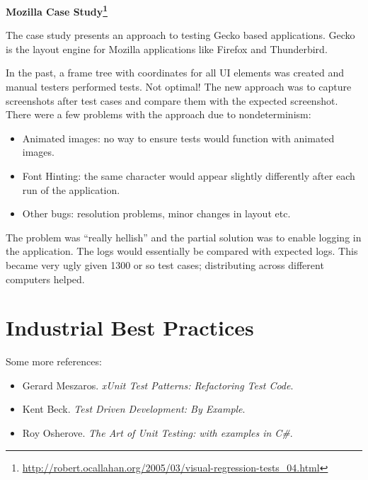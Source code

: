 \documentclass[11pt]{article}
\begin{document}
\textbf{Mozilla Case Study\footnote{\url{http://robert.ocallahan.org/2005/03/visual-regression-tests_04.html}}}

The case study presents an approach to testing Gecko based applications. Gecko is the layout engine for Mozilla applications like Firefox and Thunderbird. 

In the past, a frame tree with coordinates for all UI elements was created and manual testers performed tests. Not optimal! The new approach was to capture screenshots after test cases and compare them with the expected screenshot. There were a few problems with the approach due to nondeterminism: 

\begin{itemize}[noitemsep]
\item Animated images: no way to ensure tests would function with animated images.
\item Font Hinting: the same character would appear slightly differently after each run of the application.
\item Other bugs: resolution problems, minor changes in layout etc.
\end{itemize}

The problem was ``really hellish'' and the partial solution was to enable logging in the application. The logs would essentially be compared with expected logs. This became very ugly given 1300 or so test cases; distributing across different computers helped.

\section*{Industrial Best Practices}

Some more references: 
\begin{itemize}[noitemsep]
\item Gerard Meszaros. \emph{xUnit Test Patterns: Refactoring Test Code}.
\item Kent Beck. \emph{Test Driven Development: By Example}.
\item Roy Osherove. \emph{The Art of Unit Testing: with examples in C\#}.
\end{itemize}
\end{document}
